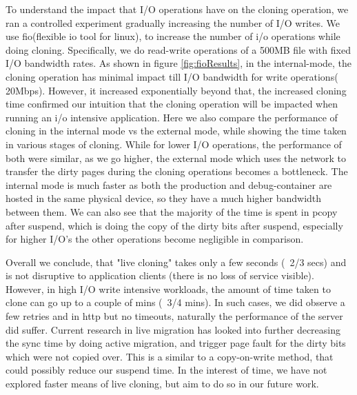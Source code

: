 To understand the impact that I/O operations have on the cloning operation, we ran a controlled experiment gradually increasing the number of I/O writes. 
We use fio(flexible io tool for linux)\cite{fio}, to increase the number of i/o operations while doing cloning. 
Specifically, we do read-write operations of a 500MB file with fixed I/O bandwidth rates.
As shown in figure \ref{fig:fioResults}, in the internal-mode, the cloning operation has minimal impact till I/O bandwidth for write operations(~ 20Mbps). 
However, it increased exponentially beyond that, the increased cloning time confirmed our intuition that the cloning operation will be impacted when running an i/o intensive application.
Here we also compare the performance of cloning in the internal mode vs the external mode, while showing the time taken in various stages of cloning.
While for lower I/O operations, the performance of both were similar, as we go higher, the external mode which uses the network to transfer the dirty pages during the cloning operations becomes a bottleneck. 
The internal mode is much faster as both the production and debug-container are hosted in the same physical device, so they have a much higher bandwidth between them.
We can also see that the majority of the time is spent in pcopy after suspend, which is doing the copy of the dirty bits after suspend, especially for higher I/O's the other operations become negligible in comparison.

Overall we conclude, that "live cloning" takes only a few seconds (~2/3 secs) and is not disruptive to application clients (there is no loss of service visible). 
However, in high I/O write intensive workloads, the amount of time taken to clone can go up to a couple of mins (~3/4 mins).
In such cases, we did observe a few retries and in http but no timeouts, naturally the performance of the server did suffer. 
Current research in live migration has looked into further decreasing the sync time by doing active migration, and trigger page fault for the dirty bits which were not copied over.
This is a similar to a copy-on-write method, that could possibly reduce our suspend time.
In the interest of time, we have not explored faster means of live cloning, but aim to do so in our future work.

